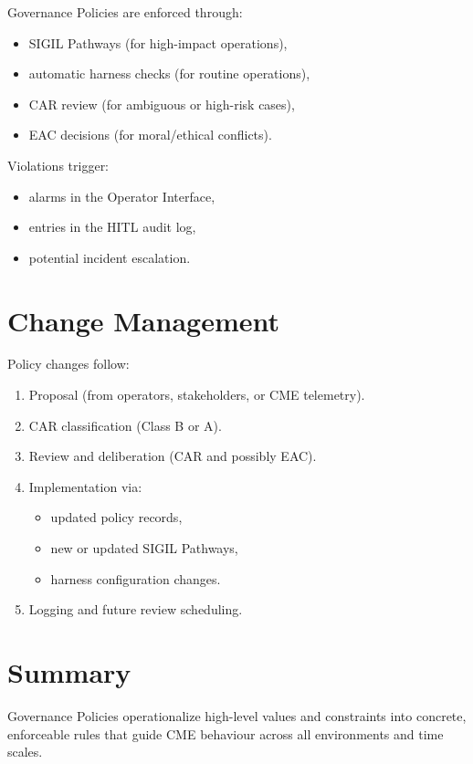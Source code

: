 Governance Policies are enforced through:

\begin{itemize}
    \item SIGIL Pathways (for high-impact operations),
    \item automatic harness checks (for routine operations),
    \item CAR review (for ambiguous or high-risk cases),
    \item EAC decisions (for moral/ethical conflicts).
\end{itemize}

Violations trigger:
\begin{itemize}
    \item alarms in the Operator Interface,
    \item entries in the HITL audit log,
    \item potential incident escalation.
\end{itemize}

\section{Change Management}

Policy changes follow:

\begin{enumerate}
    \item Proposal (from operators, stakeholders, or CME telemetry).
    \item CAR classification (Class B or A).
    \item Review and deliberation (CAR and possibly EAC).
    \item Implementation via:
    \begin{itemize}
        \item updated policy records,
        \item new or updated SIGIL Pathways,
        \item harness configuration changes.
    \end{itemize}
    \item Logging and future review scheduling.
\end{enumerate}

\section{Summary}

Governance Policies operationalize high-level values and constraints into
concrete, enforceable rules that guide CME behaviour across all environments
and time scales.
